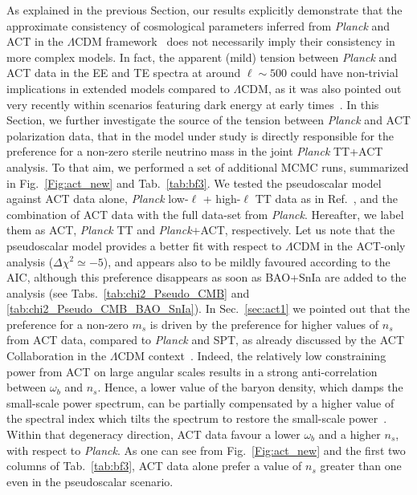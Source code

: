 \documentclass[a4paper,11pt]{article}
\begin{document}
As explained in the previous Section, our results explicitly demonstrate that the approximate consistency of cosmological parameters inferred from \emph{Planck} and ACT in the $\Lambda$CDM framework~\cite{Aiola:2020azj} does not necessarily imply their consistency in more complex models. In fact, the apparent (mild) tension between \emph{Planck} and ACT data in the EE and TE spectra at around $ \ell \sim 500$ could have non-trivial implications in extended models compared to $\Lambda$CDM, as it was also pointed out very recently within scenarios featuring dark energy at early times~\cite{Poulin:2021bjr,Hill:2021yec}. In this Section, we further investigate the source of the tension between \textit{Planck} and ACT polarization data, that in the model under study is directly responsible for the preference for a non-zero sterile neutrino mass in the joint \emph{Planck} TT+ACT analysis. To that aim, we performed a set of additional MCMC runs, summarized in Fig.~\ref{Fig:act_new} and Tab.~\ref{tab:bf3}.
We tested the pseudoscalar model against ACT data alone, \emph{Planck} low-$\ell$ + high-$\ell$ TT data as in Ref.~\cite{Archidiacono:2020yey}, and the combination of ACT data with the full data-set from \emph{Planck}. Hereafter, we label them as ACT, \emph{Planck} TT and \emph{Planck}+ACT, respectively.
Let us note that the pseudoscalar model provides a better fit with respect to $\Lambda$CDM in the ACT-only analysis ($\Delta\chi^2 \simeq -5$), and appears also to be mildly favoured according to the AIC, although this preference disappears as soon as BAO+SnIa are added to the analysis (see Tabs.~\ref{tab:chi2_Pseudo_CMB} and \ref{tab:chi2_Pseudo_CMB_BAO_SnIa}).
In Sec.~\ref{sec:act1} we pointed out that the preference for a non-zero $m_s$ is driven by the preference for higher values of $n_s$ from ACT data, compared to \emph{Planck} and SPT, as already {discussed} by the ACT Collaboration in the $\Lambda$CDM context~\cite{Aiola:2020azj}.
Indeed, the relatively low constraining power from ACT on large angular scales results in a strong anti-correlation between $\omega_b$ and $n_s$. Hence, a lower value of the baryon density, which damps the small-scale power spectrum, can be partially compensated by a higher value of the spectral index which tilts the spectrum to restore the small-scale power~\cite{Aiola:2020azj}.
Within that degeneracy direction, ACT data favour a lower $\omega_b$ and a higher $n_s$, with respect to \emph{Planck}.
As one can see from Fig.~\ref{Fig:act_new} and the first two columns of Tab.~\ref{tab:bf3}, ACT data alone prefer a value of $n_s$ greater than one {even in the pseudoscalar scenario}.
\end{document}
